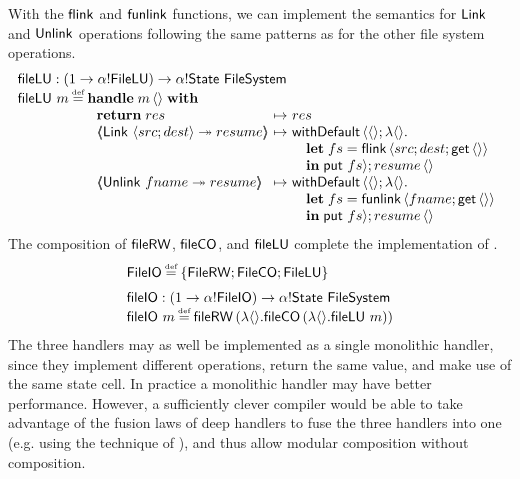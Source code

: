 \documentclass[12pt,phd,lfcs,twoside,openright,logo,leftchapter,normalheadings]{infthesis}
\theoremstyle{plain}
\theoremstyle{definition}
\begin{document}
With the $\mathsf{flink}$ and $\mathsf{funlink}$ functions, we can implement the
semantics for $\mathsf{Link}$ and $\mathsf{Unlink}$ operations following the same
patterns as for the other file system operations.
%
\[
  \bl
    \fileLU : (\UnitType \to \alpha \eff \FileLU) \to \alpha \eff \State~\FileSystem\\
    \fileLU~m \defas
       \bl
         \Handle\;m\,\Unit\;\With\\
             ~\ba{@{~}l@{~}c@{~}l}
                 \Return\;res      &\mapsto& res\\
                 \OpCase{\ULink}{\Record{src;dest}}{resume} &\mapsto&
                   \bl
                     \faild\,\Record{\Unit; \lambda\Unit.\\
                       \quad\bl
                         \Let\;fs = \flink\,\Record{src;dest;\Uget\,\Unit}\\
                         \In\;\Uput~fs}; resume\,\Unit
                       \el
                   \el\\
                 \OpCase{\UUnlink}{fname}{resume} &\mapsto&
                   \bl
                     \faild\,\Record{\Unit; \lambda\Unit.\\
                       \quad\bl
                         \Let\;fs = \funlink\,\Record{fname;\Uget\,\Unit}\\
                         \In\;\Uput~fs}; resume\,\Unit
                       \el
                   \el
               \ea
       \el
  \el
\]
%
The composition of $\mathsf{fileRW}$, $\mathsf{fileCO}$, and $\mathsf{fileLU}$ complete the
implementation of \fsname{}.
%
\[
  \bl
    \FileIO \defas \{\FileRW;\FileCO;\FileLU\} \medskip\\
    \fileIO : (\UnitType \to \alpha \eff \FileIO) \to \alpha \eff \State~\FileSystem \\
    \fileIO~m \defas \fileRW\,(\lambda\Unit. \fileAlloc\,(\lambda\Unit.\fileLU~m))
  \el
\]
%
The three handlers may as well be implemented as a single monolithic
handler, since they implement different operations, return the same
value, and make use of the same state cell. In practice a monolithic
handler may have better performance. However, a sufficiently clever
compiler would be able to take advantage of the fusion laws of deep
handlers to fuse the three handlers into one (e.g. using the technique
of \citet{WuS15}), and thus allow modular composition without
composition.
\end{document}
